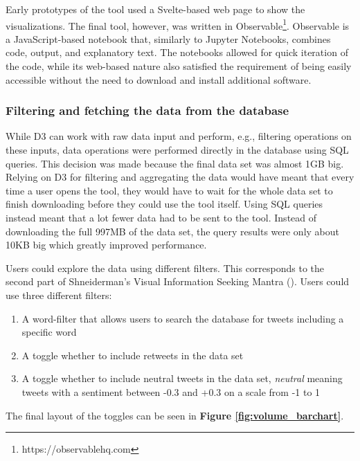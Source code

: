 Early prototypes of the tool used a Svelte-based web page to show the visualizations. The final tool, however, was written in Observable\footnote{https://observablehq.com}. Observable is a JavaScript-based notebook that, similarly to Jupyter Notebooks, combines code, output, and explanatory text. The notebooks allowed for quick iteration of the code, while its web-based nature also satisfied the requirement of being easily accessible without the need to download and install additional software.

\subsubsection{Filtering and fetching the data from the database}
While D3 can work with raw data input and perform, e.g., filtering operations on these inputs, data operations were performed directly in the database using SQL queries. This decision was made because the final data set was almost 1GB big. Relying on D3 for filtering and aggregating the data would have meant that every time a user opens the tool, they would have to wait for the whole data set to finish downloading before they could use the tool itself. Using SQL queries instead meant that a lot fewer data had to be sent to the tool. Instead of downloading the full 997MB of the data set, the query results were only about 10KB big which greatly improved performance.

Users could explore the data using different filters. This corresponds to the second part of Shneiderman's Visual Information Seeking Mantra  (\cite[337]{shneidermanEyesHaveIt1996}). Users could use three different filters:

\begin{enumerate}
    \item A word-filter that allows users to search the database for tweets including a specific word
    \item A toggle whether to include retweets in the data set
    \item A toggle whether to include neutral tweets in the data set, \emph{neutral} meaning tweets with a sentiment between -0.3 and +0.3 on a scale from -1 to 1 %
\end{enumerate}

The final layout of the toggles can be seen in \textbf{Figure \ref{fig:volume_barchart}}.

